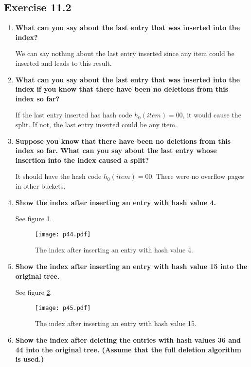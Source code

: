 \subsection{Exercise 11.2}
\begin{enumerate}
\item {\bf What can you say about the last entry that was inserted into the index?}

We can say nothing about the last entry inserted since any item could be inserted and leads to this result.

\item {\bf What can you say about the last entry that was inserted into the index if you know that there have been no deletions from this index so far?}

If the last entry inserted has hash code $h_0(item) = 00$, it would cause the split.  If not, the last entry inserted could be any item.

\item {\bf Suppose you know that there have been no deletions from this index so far. What can you say about the last entry whose insertion into the index caused a split?}

It should have the hash code $h_0(item) = 00$.  There were no overflow pages in other buckets.

\item {\bf Show the index after inserting an entry with hash value 4.}

See figure \ref{p44}.

\begin{figure}[h]
\begin{center}
\texttt{[image: p44.pdf]}
\end{center}
\caption{The index after inserting an entry with hash value 4.}
\label{p44}
\end{figure}

\item {\bf Show the index after inserting an entry with hash value 15 into the original tree.}

See figure \ref{p45}.

\begin{figure}[h]
\begin{center}
\texttt{[image: p45.pdf]}
\end{center}
\caption{The index after inserting an entry with hash value 15.}
\label{p45}
\end{figure}

\item {\bf Show the index after deleting the entries with hash values 36 and 44 into the original tree. (Assume that the full deletion algorithm is used.)}


\end{enumerate}
